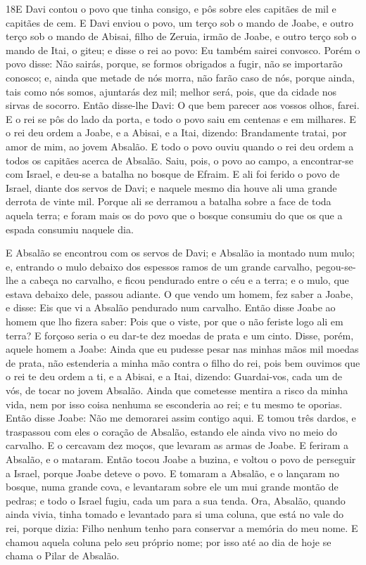 \lettrine{18} E Davi contou o povo que tinha consigo, e pôs
sobre eles capitães de mil e capitães de cem. E Davi enviou o
povo, um terço sob o mando de Joabe, e outro terço sob o mando de
Abisai, filho de Zeruia, irmão de Joabe, e outro terço sob o mando
de Itai, o giteu; e disse o rei ao povo: Eu também sairei convosco.
Porém o povo disse: Não sairás, porque, se formos obrigados a
fugir, não se importarão conosco; e, ainda que metade de nós morra,
não farão caso de nós, porque ainda, tais como nós somos, ajuntarás
dez mil; melhor será, pois, que da cidade nos sirvas de socorro.
Então disse-lhe Davi: O que bem parecer aos vossos olhos, farei.
E o rei se pôs do lado da porta, e todo o povo saiu em centenas e em
milhares. E o rei deu ordem a Joabe, e a Abisai, e a Itai,
dizendo: Brandamente tratai, por amor de mim, ao jovem Absalão. E
todo o povo ouviu quando o rei deu ordem a todos os capitães acerca
de Absalão. Saiu, pois, o povo ao campo, a encontrar-se com
Israel, e deu-se a batalha no bosque de Efraim. E ali foi ferido
o povo de Israel, diante dos servos de Davi; e naquele mesmo dia
houve ali uma grande derrota de vinte mil. Porque ali se
derramou a batalha sobre a face de toda aquela terra; e foram mais
os do povo que o bosque consumiu do que os que a espada consumiu
naquele dia.

E Absalão se encontrou com os servos de Davi; e Absalão ia montado
num mulo; e, entrando o mulo debaixo dos espessos ramos de um grande
carvalho, pegou-se-lhe a cabeça no carvalho, e ficou pendurado entre
o céu e a terra; e o mulo, que estava debaixo dele, passou adiante.
O que vendo um homem, fez saber a Joabe, e disse: Eis que vi
a Absalão pendurado num carvalho. Então disse Joabe ao homem
que lho fizera saber: Pois que o viste, por que o não feriste logo
ali em terra? E forçoso seria o eu dar-te dez moedas de prata e um
cinto. Disse, porém, aquele homem a Joabe: Ainda que eu
pudesse pesar nas minhas mãos mil moedas de prata, não estenderia a
minha mão contra o filho do rei, pois bem ouvimos que o rei te deu
ordem a ti, e a Abisai, e a Itai, dizendo: Guardai-vos, cada um de
vós, de tocar no jovem Absalão. Ainda que cometesse mentira a
risco da minha vida, nem por isso coisa nenhuma se esconderia ao
rei; e tu mesmo te oporias. Então disse Joabe: Não me
demorarei assim contigo aqui. E tomou três dardos, e traspassou com
eles o coração de Absalão, estando ele ainda vivo no meio do
carvalho. E o cercavam dez moços, que levaram as armas de
Joabe. E feriram a Absalão, e o mataram. Então tocou Joabe a
buzina, e voltou o povo de perseguir a Israel, porque Joabe deteve o
povo. E tomaram a Absalão, e o lançaram no bosque, numa
grande cova, e levantaram sobre ele um mui grande montão de pedras;
e todo o Israel fugiu, cada um para a sua tenda. Ora,
Absalão, quando ainda vivia, tinha tomado e levantado para si uma
coluna, que está no vale do rei, porque dizia: Filho nenhum tenho
para conservar a memória do meu nome. E chamou aquela coluna pelo
seu próprio nome; por isso até ao dia de hoje se chama o Pilar de
Absalão.

